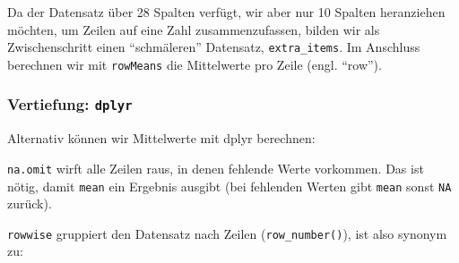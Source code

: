 \documentclass[12pt,ngerman,]{book}
\makeatletter
\newenvironment{Shaded}{\begin{snugshade}}{\end{snugshade}}
\newcommand{\KeywordTok}[1]{\textcolor[rgb]{0.13,0.29,0.53}{\textbf{{#1}}}}
\newcommand{\DataTypeTok}[1]{\textcolor[rgb]{0.13,0.29,0.53}{{#1}}}
\newcommand{\StringTok}[1]{\textcolor[rgb]{0.31,0.60,0.02}{{#1}}}
\newcommand{\CommentTok}[1]{\textcolor[rgb]{0.56,0.35,0.01}{\textit{{#1}}}}
\newcommand{\NormalTok}[1]{{#1}}
\newenvironment{kframe}{%
\medskip{}
\setlength{\fboxsep}{.8em}
 \def\at@end@of@kframe{}%
 \ifinner\ifhmode%
  \def\at@end@of@kframe{\end{minipage}}%
  \begin{minipage}{\columnwidth}%
 \fi\fi%
 \def\FrameCommand##1{\hskip\@totalleftmargin \hskip-\fboxsep
 \colorbox{shadecolor}{##1}\hskip-\fboxsep
     \hskip-\linewidth \hskip-\@totalleftmargin \hskip\columnwidth}%
 \MakeFramed {\advance\hsize-\width
   \@totalleftmargin\z@ \linewidth\hsize
   \@setminipage}}%
 {\par\unskip\endMakeFramed%
 \at@end@of@kframe}
\renewenvironment{Shaded}{\begin{kframe}}{\end{kframe}}
\makeatother
\begin{document}
Da der Datensatz über 28 Spalten verfügt, wir aber nur 10 Spalten
heranziehen möchten, um Zeilen auf eine Zahl zusammenzufassen, bilden
wir als Zwischenschritt einen ``schmäleren'' Datensatz,
\texttt{extra\_items}. Im Anschluss berechnen wir mit \texttt{rowMeans}
die Mittelwerte pro Zeile (engl. ``row'').

\subsubsection{\texorpdfstring{Vertiefung:
\texttt{dplyr}}{Vertiefung: dplyr}}\label{vertiefung-dplyr}

Alternativ können wir Mittelwerte mit dplyr berechnen:

\begin{Shaded}
\end{Shaded}

\texttt{na.omit} wirft alle Zeilen raus, in denen fehlende Werte
vorkommen. Das ist nötig, damit \texttt{mean} ein Ergebnis ausgibt (bei
fehlenden Werten gibt \texttt{mean} sonst \texttt{NA} zurück).

\texttt{rowwise} gruppiert den Datensatz nach Zeilen
(\texttt{row\_number()}), ist also synonym zu:

\begin{Shaded}
\end{Shaded}
\end{document}
